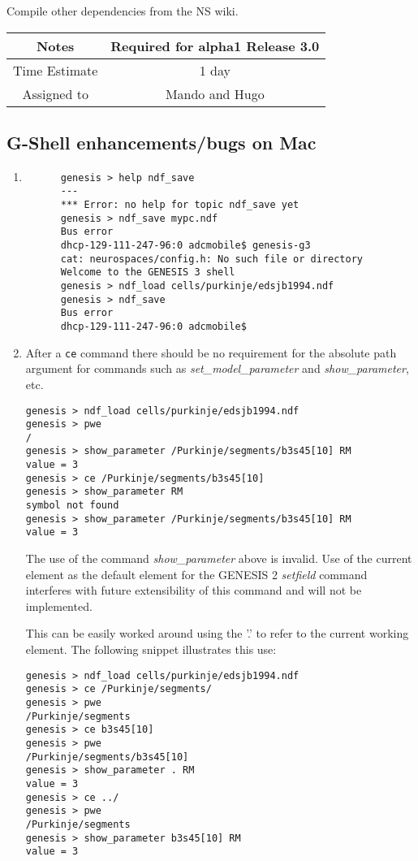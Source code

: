 \documentclass[12pt]{article}
\begin{document}
Compile other dependencies from the NS wiki.

{
  \vspace{5mm}
  \centering
  \begin{tabular}{|c|c|}
    \hline
    Notes
    & Required for alpha1 Release 3.0 \\
    \hline
    Time Estimate
    & 1 day \\
    \hline
    Assigned to
    & Mando and Hugo \\
    \hline
  \end{tabular}
}


\subsection{G-Shell enhancements/bugs on Mac}

\begin{enumerate}
   \item 
   \begin{verbatim}
      genesis > help ndf_save
      ---
      *** Error: no help for topic ndf_save yet
      genesis > ndf_save mypc.ndf
      Bus error
      dhcp-129-111-247-96:0 adcmobile$ genesis-g3
      cat: neurospaces/config.h: No such file or directory
      Welcome to the GENESIS 3 shell
      genesis > ndf_load cells/purkinje/edsjb1994.ndf
      genesis > ndf_save
      Bus error
      dhcp-129-111-247-96:0 adcmobile$
   \end{verbatim}
   
   \item After a {\tt ce} command there should be no requirement for the absolute path argument for commands such as {\it set\_model\_parameter} and {\it show\_parameter}, etc.
\begin{verbatim}
genesis > ndf_load cells/purkinje/edsjb1994.ndf
genesis > pwe
/
genesis > show_parameter /Purkinje/segments/b3s45[10] RM
value = 3
genesis > ce /Purkinje/segments/b3s45[10]  
genesis > show_parameter RM
symbol not found      
genesis > show_parameter /Purkinje/segments/b3s45[10] RM
value = 3
\end{verbatim} 

     The use of the command {\it show\_parameter} above is invalid.
     Use of the current element as the default element for the GENESIS
     2 {\it setfield} command interferes with future extensibility of
     this command and will not be implemented.

     This can be easily worked around using the '.' to refer to the
     current working element.  The following snippet illustrates this
     use:
\begin{verbatim}
genesis > ndf_load cells/purkinje/edsjb1994.ndf
genesis > ce /Purkinje/segments/
genesis > pwe
/Purkinje/segments
genesis > ce b3s45[10]
genesis > pwe
/Purkinje/segments/b3s45[10]
genesis > show_parameter . RM
value = 3
genesis > ce ../
genesis > pwe
/Purkinje/segments
genesis > show_parameter b3s45[10] RM
value = 3
\end{verbatim}
\end{enumerate}
\end{document}
